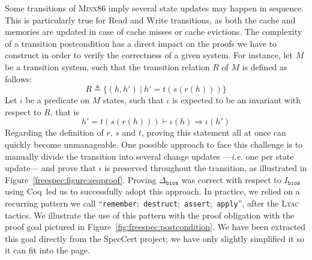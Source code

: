 Some transitions of {\scshape Minx86} imply several state updates may happen in
sequence.
%
This is particularly true for \( \mathrm{Read} \) and \( \mathrm{Write} \)
transitions, as both the cache and memories are updated in case of cache misses
or cache evictions.
%
The complexity of a transition postcondition has a direct impact on the proofs
we have to construct in order to verify the correctness of a given system.
%
For instance, let \( M \) be a transition system, such that the transition
relation \( R \) of \( M \) is defined as follows:
%
\[
  R \triangleq \{ (h, h')\ |\ h' = t(s(r(h))) \}
\]
%
Let \( \iota \) be a predicate on \( M \) states, such that \( \iota \) is
expected to be an invariant with respect to \( R \), that is
%
\[
  h' = t(s(r(h))) \vdash \iota(h) \Rightarrow \iota(h')
\]
%
Regarding the definition of \( r \), \( s \) and \( t \), proving this statement
all at once can quickly become unmanageable.
%
One possible approach to face this challenge is to manually divide the
transition into several change updates ---\emph{i.e.} one per state update---
and prove that \( \iota \) is preserved throughout the transition, as
illustrated in Figure~\ref{freespec:figure:seqproof}.
%
Proving \( \Delta_{\mathtt{bios}} \) was correct with respect to
\( I_{\mathtt{bios}} \) using Coq\,\cite{letan2016speccertcode} led us to
successfully adopt this approach.
%
In practice, we relied on a recurring pattern we call
``\texttt{remember};~\texttt{destruct};~\texttt{assert};~\texttt{apply}'', after
the {\scshape Ltac} tactics.
%
We illustrate the use of this pattern with the proof obligation with the proof
goal pictured in Figure~\ref{fig:freespec:postcondition}.
%
We have been extracted this goal directly from the SpecCert project; we have
only slightly simplified it so it can fit into the page.
%
